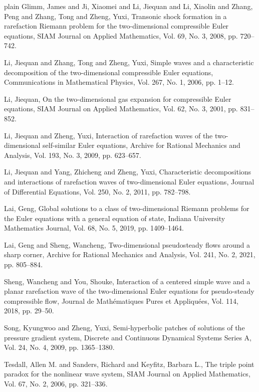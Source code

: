 \documentclass[3p,11pt]{elsarticle}
\numberwithin{equation}{section}
\begin{document}
\begin{thebibliography}{plain}
{Glimm, James and Ji, Xiaomei and Li, Jiequan and Li, Xiaolin and Zhang, Peng and Zhang, Tong and Zheng, Yuxi,
Transonic shock formation in a rarefaction Riemann problem for the two-dimensional compressible Euler equations,
SIAM Journal on Applied Mathematics, Vol. 69, No. 3, 2008, pp. 720--742}.

{Li, Jiequan and Zhang, Tong and Zheng, Yuxi,
Simple waves and a characteristic decomposition of the two-dimensional compressible Euler equations,
Communications in Mathematical Physics, Vol. 267, No. 1, 2006, pp. 1--12}.

{Li, Jiequan,
On the two-dimensional gas expansion for compressible Euler equations,
SIAM Journal on Applied Mathematics, Vol. 62, No. 3, 2001, pp. 831--852}.

{Li, Jiequan and Zheng, Yuxi,
Interaction of rarefaction waves of the two-dimensional self-similar Euler equations,
Archive for Rational Mechanics and Analysis, Vol. 193, No. 3, 2009, pp. 623--657}.

{Li, Jiequan and Yang, Zhicheng and Zheng, Yuxi,
Characteristic decompositions and interactions of rarefaction waves of two-dimensional Euler equations,
Journal of Differential Equations, Vol. 250, No. 2, 2011, pp. 782--798}.

{Lai, Geng,
Global solutions to a class of two-dimensional Riemann problems for the Euler equations with a general equation of state,
Indiana University Mathematics Journal, Vol. 68, No. 5, 2019, pp. 1409--1464}.

{Lai, Geng and Sheng, Wancheng,
Two-dimensional pseudosteady flows around a sharp corner,
Archive for Rational Mechanics and Analysis, Vol. 241, No. 2, 2021, pp. 805--884}.

{Sheng, Wancheng and You, Shouke,
Interaction of a centered simple wave and a planar rarefaction wave of the two-dimensional Euler equations for pseudo-steady compressible flow,
Journal de Math\'ematiques Pures et Appliqu\'ees, Vol. 114, 2018, pp. 29--50}.

{Song, Kyungwoo and Zheng, Yuxi,
Semi-hyperbolic patches of solutions of the pressure gradient system,
Discrete and Continuous Dynamical Systems Series A, Vol. 24, No. 4, 2009, pp. 1365--1380}.

{Tesdall, Allen M. and Sanders, Richard and Keyfitz, Barbara L.,
The triple point paradox for the nonlinear wave system,
SIAM Journal on Applied Mathematics, Vol. 67, No. 2, 2006, pp. 321--336}.


\end{thebibliography}
\end{document}
